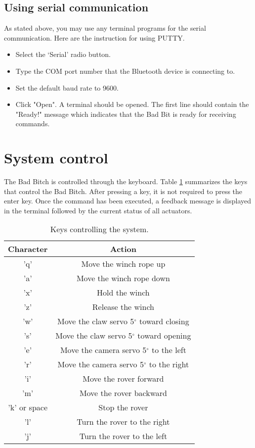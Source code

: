 \documentclass[letterpaper, 12 pt]{article}
\begin{document}
\subsection{Using serial communication}
As stated above, you may use any terminal programs for the serial communication. Here are the instruction for using PUTTY.
\begin{itemize}
\item Select the ‘Serial’ radio button.
\item Type the COM port number that the Bluetooth device is connecting to.
\item Set the default baud rate to 9600.
\item Click "Open". A terminal should be opened. The first line should contain the "Ready!" message which indicates that the Bad Bit is ready for receiving commands.
\end{itemize}
\section{System control}
The Bad Bitch is controlled through the keyboard. Table \ref{tab:keys} summarizes the keys that control the Bad Bitch. After pressing a key, it is not required to press the enter key. Once the command has been executed, a feedback message is displayed in the terminal followed by the current status of all actuators.
\begin{table}[h]
\begin{center}
\caption{Keys controlling the system.}
\label{tab:keys}
\vspace{0.5cm}
\begin{tabular}{|c|c|}
\hline
\textbf{Character} & \textbf{Action}\\
\hline
'q' & Move the winch rope up\\
\hline
'a' & Move the winch rope down\\
\hline
'x' & Hold the winch\\
\hline
'z' & Release the winch\\
\hline 
'w' & Move the claw servo 5$^{\circ}$ toward closing\\
\hline  
's' & Move the claw servo 5$^{\circ}$ toward opening\\
\hline
'e' & Move the camera servo 5$^{\circ}$ to the left\\
\hline  
'r' & Move the camera servo 5$^{\circ}$ to the right\\
\hline
'i' & Move the rover forward\\
\hline
'm' & Move the rover backward\\
\hline
'k' or space & Stop the rover\\
\hline
'l' & Turn the rover to the right\\
\hline
'j' & Turn the rover to the left\\
\hline

\end{tabular}
\end{center}
\end{table}
%

\end{document}
